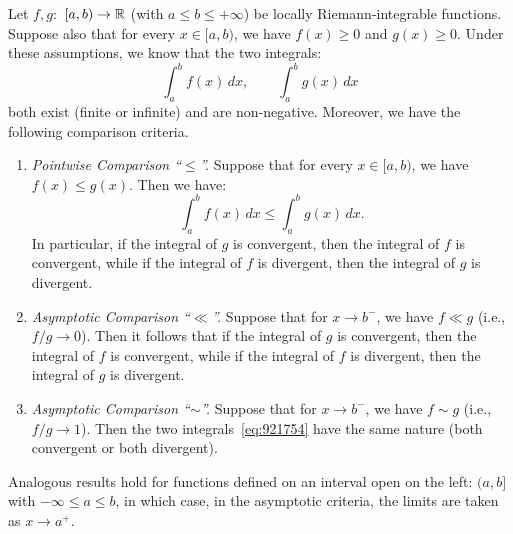 \begin{theorem}
\mymark{**}
Let $f, g \colon$ $ [a,b)\to {\mathbb R}$ (with $a \le b \le +\infty$) be locally
Riemann-integrable functions. Suppose also that for every $x\in [a,b)$, we have
$f(x)\ge 0$ and $g(x)\ge 0$. Under these assumptions, we know that the two
integrals:
\begin{equation}\label{eq:921754}
  \int_a^b f(x)\, dx, \qquad \int_a^b g(x)\, dx
\end{equation}
both exist (finite or infinite) and are non-negative. Moreover, we have the
following comparison criteria.

\begin{enumerate}
\item \emph{Pointwise Comparison ``$\le$''.}
Suppose that for every $x\in [a,b)$, we have $f(x) \le g(x)$. Then we have:
\begin{equation}\label{eq:467143}
  \int_a^b f(x)\, dx \le \int_a^b g(x)\, dx.
\end{equation}
In particular, if the integral of $g$ is convergent, then the integral of $f$ is
convergent, while if the integral of $f$ is divergent, then the integral of $g$
is divergent.

\item \emph{Asymptotic Comparison ``$\ll$''.}
Suppose that for $x\to b^-$, we have $f \ll g$ (i.e., $f/g\to 0$). Then it
follows that if the integral of $g$ is convergent, then the integral of $f$ is
convergent, while if the integral of $f$ is divergent, then the integral of $g$
is divergent.

\item \emph{Asymptotic Comparison ``$\sim$''.}
Suppose that for $x\to b^-$, we have $f\sim g$ (i.e., $f/g\to 1$). Then the two
integrals~\eqref{eq:921754} have the same nature (both convergent or both
divergent).
\end{enumerate}

Analogous results hold for functions defined on an interval open on the left:
$(a, b]$ with $-\infty \le a \le b$, in which case, in the asymptotic criteria,
the limits are taken as $x\to a^+$.
\end{theorem}
%
